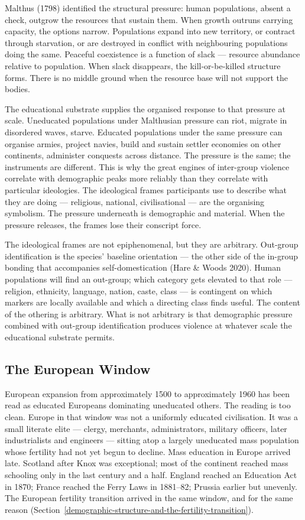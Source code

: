 \documentclass[12pt,letterpaper]{article}
\begin{document}
Malthus (1798) identified the structural pressure: human populations,
absent a check, outgrow the resources that sustain them. When growth
outruns carrying capacity, the options narrow. Populations expand into
new territory, or contract through starvation, or are destroyed in
conflict with neighbouring populations doing the same. Peaceful
coexistence is a function of slack --- resource abundance relative to
population. When slack disappears, the kill-or-be-killed structure
forms. There is no middle ground when the resource base will not
support the bodies.

The educational substrate supplies the organised response to that
pressure at scale. Uneducated populations under Malthusian pressure can
riot, migrate in disordered waves, starve. Educated populations under
the same pressure can organise armies, project navies, build and
sustain settler economies on other continents, administer conquests
across distance. The pressure is the same; the instruments are
different. This is why the great engines of inter-group violence
correlate with demographic peaks more reliably than they correlate with
particular ideologies. The ideological frames participants use to
describe what they are doing --- religious, national, civilisational
--- are the organising symbolism. The pressure underneath is
demographic and material. When the pressure releases, the frames lose
their conscript force.

The ideological frames are not epiphenomenal, but they are arbitrary.
Out-group identification is the species' baseline orientation --- the
other side of the in-group bonding that accompanies self-domestication
(Hare \& Woods 2020). Human populations will find an out-group; which
category gets elevated to that role --- religion, ethnicity, language,
nation, caste, class --- is contingent on which markers are locally
available and which a directing class finds useful. The content of the
othering is arbitrary. What is not arbitrary is that demographic
pressure combined with out-group identification produces violence at
whatever scale the educational substrate permits.

\subsection{The European Window}\label{the-european-window}

European expansion from approximately 1500 to approximately 1960 has
been read as educated Europeans dominating uneducated others. The
reading is too clean. Europe in that window was not a uniformly
educated civilisation. It was a small literate elite --- clergy,
merchants, administrators, military officers, later industrialists and
engineers --- sitting atop a largely uneducated mass population whose
fertility had not yet begun to decline. Mass education in Europe
arrived late. Scotland after Knox was exceptional; most of the
continent reached mass schooling only in the last century and a half.
England reached an Education Act in 1870; France reached the Ferry
Laws in 1881--82; Prussia earlier but unevenly. The European fertility
transition arrived in the same window, and for the same reason
(Section~\ref{demographic-structure-and-the-fertility-transition}).
\end{document}
